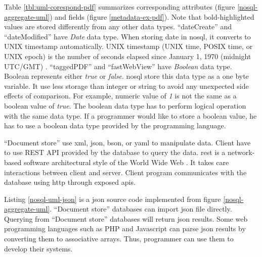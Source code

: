 Table \ref{tbl:uml-corespond-pdf} summarizes corresponding attributes (figure \ref{nosql-aggregate-uml}) and fields (figure \ref{metadata-ex-pdf}).
Note that bold-highlighted values are stored differently from any other data types.
\enquote{dateCreate} and \enquote{dateModified} have \textit{Date} data type.
When storing date in \gls{nosql}, it converts to UNIX timestamp automatically.
UNIX timestamp (UNIX time, POSIX time, or UNIX epoch) is the number of seconds elapsed since January 1, 1970 (midnight UTC/GMT) \cite{unix-time}.
\enquote{taggedPDF} and \enquote{fastWebView} have \textit{Boolean} data type.
Boolean represents either \textit{true} or \textit{false}.
\gls{nosql} store this data type as a one byte variable.
It use less storage than integer or string to avoid any unexpected side effects of comparison. 
For example, numeric value of \textit{1} is not the same as a boolean value of \textit{true}.
The boolean data type has to perform logical operation with the same data type.
If a programmer would like to store a boolean value, he has to use a boolean data type provided by the programming language.

\enquote{Document store} use \gls{xml}, \gls{json}, \gls{bson}, or \gls{yaml} to manipulate data.
Client have to use REST API provided by the database to query the data.
\gls{rest} is a network-based software architectural style of the World Wide Web \cite{doglio, masse_2012}.
It takes care interactions between client and server.
Client program communicates with the database using \gls{http} through exposed \glspl{api}.

Listing \ref{nosql-uml-json} is a \gls{json} source code implemented from figure \ref{nosql-aggregate-uml}.
\enquote{Document store} databases can import \gls{json} file directly.
Querying from \enquote{Document store} databases will return \gls{json} results.
Some web programming languages such as PHP and Javascript can parse \gls{json} results by converting them to associative arrays.
Thus, programmer can use them to develop their systems.



